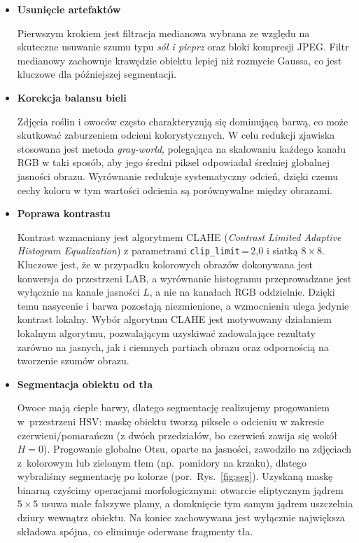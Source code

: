 \documentclass[10pt,a4paper]{article}
\begin{document}
\begin{itemize}\itemsep1pt

\item \textbf{Usunięcie artefaktów}

Pierwszym krokiem jest filtracja medianowa wybrana ze względu na skuteczne usuwanie szumu typu
\emph{sól i pieprz} oraz bloki kompresji JPEG. Filtr medianowy zachowuje krawędzie
obiektu lepiej niż rozmycie Gaussa, co jest kluczowe dla późniejszej segmentacji.

\item \textbf{Korekcja balansu bieli}

Zdjęcia roślin i owoców często charakteryzują się dominującą barwą, co może skutkować zaburzeniem odcieni kolorystycznych. W celu redukcji zjawiska stosowana jest metoda \emph{gray-world}, polegająca na skalowaniu każdego kanału RGB w taki sposób, aby jego średni piksel odpowiadał średniej globalnej jasności obrazu. Wyrównanie redukuje systematyczny odcień, dzięki czemu cechy koloru w tym wartości odcienia są porównywalne między obrazami.

\item \textbf{Poprawa kontrastu}

Kontrast wzmacniany jest algorytmem CLAHE (\emph{Contrast Limited Adaptive
Histogram Equalization}) z parametrami \texttt{clip\_limit}\,=\,2{,}0 i
siatką $8{\times}8$. Kluczowe jest, że w przypadku kolorowych obrazów dokonywana jest konwersja do przestrzeni LAB, a wyrównanie histogramu przeprowadzane jest wyłącznie na kanale jasności $L$, a nie na kanałach RGB oddzielnie. Dzięki temu nasycenie i barwa pozostają niezmienione, a wzmocnieniu ulega jedynie kontrast lokalny. Wybór algorytmu CLAHE jest motywowany działaniem lokalnym algorytmu, pozwalającym uzyskiwać zadowalające rezultaty zarówno na jasnych, jak i ciemnych partiach obrazu oraz odpornością na tworzenie szumów obrazu.

\item \textbf{Segmentacja obiektu od tła}

Owoce mają ciepłe barwy, dlatego segmentację realizujemy progowaniem
w~przestrzeni HSV: maskę obiektu tworzą piksele o odcieniu w zakresie
czerwieni/pomarańczu (z dwóch przedziałów, bo czerwień zawija się wokół $H=0$).
Progowanie globalne Otsu, oparte na jasności, zawodziło na zdjęciach
z~kolorowym lub zielonym tłem (np.\ pomidory na krzaku), dlatego wybraliśmy
segmentację po kolorze (por.\ Rys.~\ref{fig:seg}). Uzyskaną maskę binarną czyścimy operacjami
morfologicznymi: otwarcie eliptycznym jądrem $5{\times}5$ usuwa małe fałszywe
plamy, a domknięcie tym samym jądrem uszczelnia dziury wewnątrz obiektu. Na
koniec zachowywana jest wyłącznie największa składowa spójna, co eliminuje
oderwane fragmenty tła.


\end{itemize}
\end{document}
